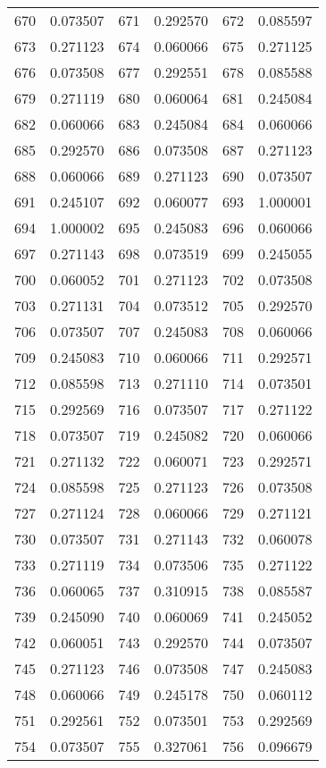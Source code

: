 \documentclass[12pt]{article}
\begin{document}
\begin{longtable}{@{}cc|cc|cc@{}}
670 & 0.073507 & 671 & 0.292570 & 672 & 0.085597 \\
673 & 0.271123 & 674 & 0.060066 & 675 & 0.271125 \\
676 & 0.073508 & 677 & 0.292551 & 678 & 0.085588 \\
679 & 0.271119 & 680 & 0.060064 & 681 & 0.245084 \\
682 & 0.060066 & 683 & 0.245084 & 684 & 0.060066 \\
685 & 0.292570 & 686 & 0.073508 & 687 & 0.271123 \\
688 & 0.060066 & 689 & 0.271123 & 690 & 0.073507 \\
691 & 0.245107 & 692 & 0.060077 & 693 & 1.000001 \\
694 & 1.000002 & 695 & 0.245083 & 696 & 0.060066 \\
697 & 0.271143 & 698 & 0.073519 & 699 & 0.245055 \\
700 & 0.060052 & 701 & 0.271123 & 702 & 0.073508 \\
703 & 0.271131 & 704 & 0.073512 & 705 & 0.292570 \\
706 & 0.073507 & 707 & 0.245083 & 708 & 0.060066 \\
709 & 0.245083 & 710 & 0.060066 & 711 & 0.292571 \\
712 & 0.085598 & 713 & 0.271110 & 714 & 0.073501 \\
715 & 0.292569 & 716 & 0.073507 & 717 & 0.271122 \\
718 & 0.073507 & 719 & 0.245082 & 720 & 0.060066 \\
721 & 0.271132 & 722 & 0.060071 & 723 & 0.292571 \\
724 & 0.085598 & 725 & 0.271123 & 726 & 0.073508 \\
727 & 0.271124 & 728 & 0.060066 & 729 & 0.271121 \\
730 & 0.073507 & 731 & 0.271143 & 732 & 0.060078 \\
733 & 0.271119 & 734 & 0.073506 & 735 & 0.271122 \\
736 & 0.060065 & 737 & 0.310915 & 738 & 0.085587 \\
739 & 0.245090 & 740 & 0.060069 & 741 & 0.245052 \\
742 & 0.060051 & 743 & 0.292570 & 744 & 0.073507 \\
745 & 0.271123 & 746 & 0.073508 & 747 & 0.245083 \\
748 & 0.060066 & 749 & 0.245178 & 750 & 0.060112 \\
751 & 0.292561 & 752 & 0.073501 & 753 & 0.292569 \\
754 & 0.073507 & 755 & 0.327061 & 756 & 0.096679 \\

\end{longtable}
\end{document}

